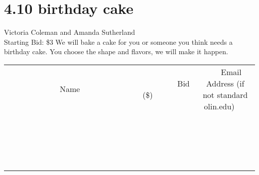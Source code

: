 \documentclass[11pt]{article}
\begin{document}
\section*{4.10 birthday cake }
Victoria Coleman and Amanda Sutherland
\\
Starting Bid: \$3
\newline
We will bake a cake for you or someone you think needs a birthday cake. You choose the shape and flavors, we will make it happen.
\\[3ex]
\begin{tabular}{c c c}
~~~~~~~~~~~~~Name~~~~~~~~~~~~~ & ~~~~~~~~~Bid (\$)~~~~~~~~~  & ~~~Email Address (if not standard olin.edu)~~~\\
 & & \\
\hline
 & & \\
\hline
 & & \\
\hline
 & & \\
\hline
 & & \\
\hline
 & & \\
\hline
 & & \\
\hline
 & & \\
\hline
 & & \\
\hline
 & & \\
\hline
 & & \\
\hline
 & & \\
\hline
 & & \\
\hline
 & & \\
\hline
 & & \\
\hline
 & & \\
\hline
 & & \\
\hline
 & & \\
\hline
 & & \\
\hline
\end{tabular}
\newpage
\end{document}
